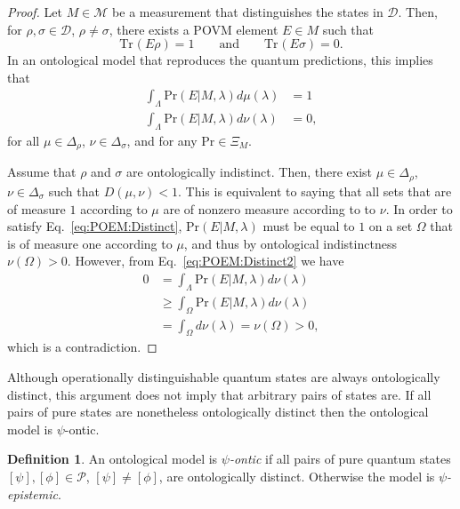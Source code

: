 \documentclass[DIV=calc,fontsize=12pt]{scrartcl} %
\theoremstyle{definition}
\newtheorem{definition}{Definition}[section]
\theoremstyle{plain}
\newcommand{\Proj}[1]{\ensuremath{\left [ #1 \right ]}}
\newcommand{\Tr}[2][]{\ensuremath{\text{Tr}_{#1} \left ( #2 \right )}}
\begin{document}
\begin{proof}
Let $M \in \mathcal{M}$ be a measurement that distinguishes the
states in $\mathcal{D}$.  Then, for $\rho, \sigma \in \mathcal{D}$,
$\rho \neq \sigma$, there exists a POVM element $E \in M$ such that
\begin{equation}
\Tr{E\rho} = 1 \qquad \text{and} \qquad \Tr{E\sigma} = 0.
\end{equation}
In an ontological model that reproduces the quantum predictions,
this implies that
\begin{align}
\int_{\Lambda} \text{Pr}(E|M,\lambda) d\mu(\lambda) & =
1 \label{eq:POEM:Distinct}\\
\int_{\Lambda} \text{Pr}(E|M,\lambda)d\nu(\lambda) & =
0, \label{eq:POEM:Distinct2}
\end{align}
for all $\mu \in \Delta_{\rho}$, $\nu \in \Delta_{\sigma}$, and for
any $\text{Pr} \in \Xi_M$.

Assume that $\rho$ and $\sigma$ are ontologically indistinct.  Then,
there exist $\mu \in \Delta_{\rho}$, $\nu \in \Delta_{\sigma}$ such
that $D(\mu,\nu) < 1$.  This is equivalent to saying that all sets
that are of measure $1$ according to $\mu$ are of nonzero measure
according to to $\nu$.  In order to satisfy
Eq.~\eqref{eq:POEM:Distinct}, $\text{Pr}(E|M,\lambda)$ must be equal
to $1$ on a set $\Omega$ that is of measure one according to $\mu$,
and thus by ontological indistinctness $\nu(\Omega) > 0$.  However,
from Eq.~\eqref{eq:POEM:Distinct2} we have
\begin{align}
0 & = \int_{\Lambda} \text{Pr}(E|M,\lambda) d\nu(\lambda) \\
& \geq \int_{\Omega} \text{Pr}(E|M,\lambda) d\nu(\lambda)\\
& = \int_{\Omega} d\nu(\lambda) = \nu(\Omega) > 0,
\end{align}
which is a contradiction.
\end{proof}

Although operationally distinguishable quantum states are always
ontologically distinct, this argument does not imply that arbitrary
pairs of states are.  If all pairs of pure states are nonetheless
ontologically distinct then the ontological model is $\psi$-ontic.
\begin{definition}
\label{def:POEM:PON}
An ontological model is $\psi$\emph{-ontic} if all pairs of pure
quantum states $\Proj{\psi}, \Proj{\phi} \in \mathcal{P}$,
$\Proj{\psi} \neq \Proj{\phi}$, are ontologically distinct.
Otherwise the model is $\psi$\emph{-epistemic}.
\end{definition}
\end{document}
